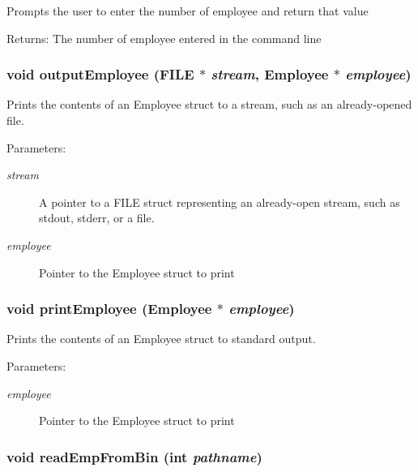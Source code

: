 Prompts the user to enter the number of employee and return that value \begin{Desc}
\item[Returns:]The number of employee entered in the command line \end{Desc}
\subsubsection{\setlength{\rightskip}{0pt plus 5cm}void output\-Employee (FILE $\ast$ {\em stream}, \bf{Employee} $\ast$ {\em employee})}\label{struct_8h_106ec703689a1f0249d6f598df15fd93}


Prints the contents of an Employee struct to a stream, such as an already-opened file. \begin{Desc}
\item[Parameters:]
\begin{description}
\item[{\em stream}]A pointer to a FILE struct representing an already-open stream, such as stdout, stderr, or a file. \item[{\em employee}]Pointer to the Employee struct to print \end{description}
\end{Desc}
\subsubsection{\setlength{\rightskip}{0pt plus 5cm}void print\-Employee (\bf{Employee} $\ast$ {\em employee})}\label{struct_8h_a28c4b8e4929dadc3d00cd55a2469e60}


Prints the contents of an Employee struct to standard output. \begin{Desc}
\item[Parameters:]
\begin{description}
\item[{\em employee}]Pointer to the Employee struct to print \end{description}
\end{Desc}
\subsubsection{\setlength{\rightskip}{0pt plus 5cm}void read\-Emp\-From\-Bin (int {\em pathname})}\label{struct_8h_b25b7aa9c6b7f289193249ea7b888fb9}


